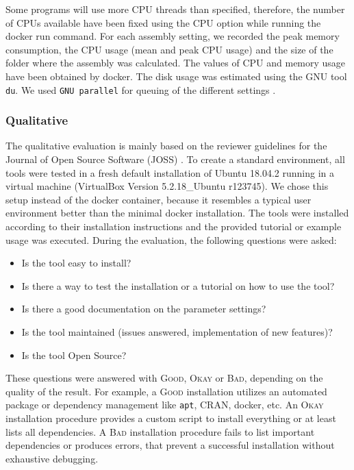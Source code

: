 \documentclass{bmcart}
\newcommand{\ok}{\textsc{Okay}}
\newcommand{\bad}{\textsc{Bad}}
\newcommand{\good}{\textsc{Good}}
\begin{document}
Some programs will use more CPU threads than specified, therefore, the number of CPUs available have been fixed using the CPU option while running the docker run command.
For each assembly setting, we recorded the peak memory consumption, the CPU usage (mean and peak CPU usage) and the size of the folder where the assembly was calculated.
The values of CPU and memory usage have been obtained by docker.
The disk usage was estimated using the GNU tool \texttt{du}.
We used \texttt{GNU parallel} for queuing of the different settings \cite{Tange2011a}.

\subsubsection*{Qualitative}
The qualitative evaluation is mainly based on the reviewer guidelines for the Journal of Open Source Software (JOSS) \cite{joss}.
To create a standard environment, all tools were tested in a fresh default installation of Ubuntu 18.04.2 running in a virtual machine (VirtualBox Version 5.2.18\_Ubuntu r123745).
We chose this setup instead of the docker container, because it resembles a typical user environment better than the minimal docker installation.
The tools were installed according to their installation instructions and the provided tutorial or example usage was executed.
During the evaluation, the following questions were asked:

\begin{itemize}
    \item Is the tool easy to install? 
    \item Is there a way to test the installation or a tutorial on how to use the tool? 
    \item Is there a good documentation on the parameter settings? 
    \item Is the tool maintained (issues answered, implementation of new features)? 
    \item Is the tool Open Source?
\end{itemize}

These questions were answered with \good{}, \ok{} or \bad{}, depending on the quality of the result. 
For example, a \good{} installation utilizes an automated package or dependency management like \texttt{apt}, CRAN, docker, etc.
An \ok{} installation procedure provides a custom script to install everything or at least lists all dependencies.
A \bad{} installation procedure fails to list important dependencies or produces errors, that prevent a successful installation without exhaustive debugging.
\end{document}
